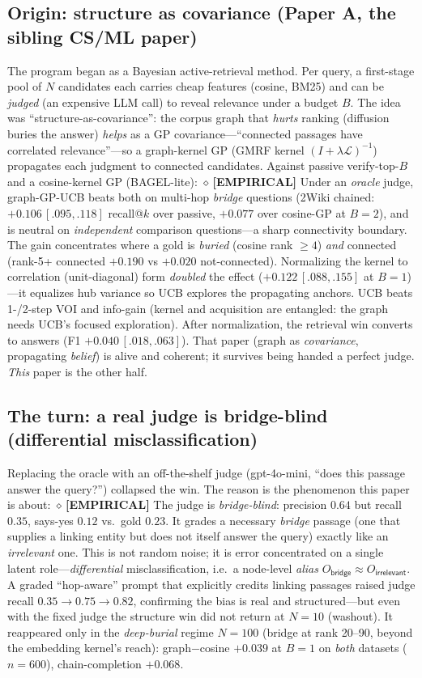 \documentclass[11pt]{article}
\newcommand{\EVID}[1]{{\color{blue!60!black}\small$\diamond$\,\textbf{[EMPIRICAL]} #1}}
\begin{document}
\subsection{Origin: structure as covariance (Paper A, the sibling CS/ML paper)}
The program began as a Bayesian active-retrieval method. Per query, a first-stage pool of $N$ candidates each
carries cheap features (cosine, BM25) and can be \emph{judged} (an expensive LLM call) to reveal relevance under a
budget $B$. The idea was ``structure-as-covariance'': the corpus graph that \emph{hurts} ranking (diffusion buries
the answer) \emph{helps} as a GP covariance---``connected passages have correlated relevance''---so a graph-kernel
GP (GMRF kernel $(I+\lambda\mathcal L)^{-1}$) propagates each judgment to connected candidates. Against passive
verify-top-$B$ and a cosine-kernel GP (BAGEL-lite):
\EVID{Under an \emph{oracle} judge, graph-GP-UCB beats both on multi-hop \emph{bridge} questions (2Wiki chained:
$+0.106\,[.095,.118]$ recall@$k$ over passive, $+0.077$ over cosine-GP at $B{=}2$), and is neutral on
\emph{independent} comparison questions---a sharp connectivity boundary. The gain concentrates where a gold is
\emph{buried} (cosine rank $\ge4$) \emph{and} connected (rank-5+ connected $+0.190$ vs $+0.020$ not-connected).
Normalizing the kernel to correlation (unit-diagonal) form \emph{doubled} the effect ($+0.122\,[.088,.155]$ at
$B{=}1$)---it equalizes hub variance so UCB explores the propagating anchors. UCB beats 1-/2-step VOI and
info-gain (kernel and acquisition are entangled: the graph needs UCB's focused exploration). After normalization,
the retrieval win converts to answers (F1 $+0.040\,[.018,.063]$).}
That paper (graph as \emph{covariance}, propagating \emph{belief}) is alive and coherent; it survives being handed
a perfect judge. \emph{This} paper is the other half.

\subsection{The turn: a real judge is bridge-blind (differential misclassification)}
Replacing the oracle with an off-the-shelf judge (gpt-4o-mini, ``does this passage answer the query?'') collapsed
the win. The reason is the phenomenon this paper is about:
\EVID{The judge is \emph{bridge-blind}: precision $0.64$ but recall $\mathbf{0.35}$, says-yes $0.12$ vs.\ gold
$0.23$. It grades a necessary \emph{bridge} passage (one that supplies a linking entity but does not itself answer
the query) exactly like an \emph{irrelevant} one. This is not random noise; it is error concentrated on a single
latent role---\emph{differential} misclassification, i.e.\ a node-level \emph{alias} $O_{\textsf{bridge}}\approx
O_{\textsf{irrelevant}}$. A graded ``hop-aware'' prompt that explicitly credits linking passages raised judge
recall $0.35\!\to\!0.75\!\to\!0.82$, confirming the bias is real and structured---but even with the fixed judge the
structure win did not return at $N{=}10$ (washout). It reappeared only in the \emph{deep-burial} regime $N{=}100$
(bridge at rank 20--90, beyond the embedding kernel's reach): graph$-$cosine $+0.039$ at $B{=}1$ on \emph{both}
datasets ($n{=}600$), chain-completion $+0.068$.}
\end{document}
